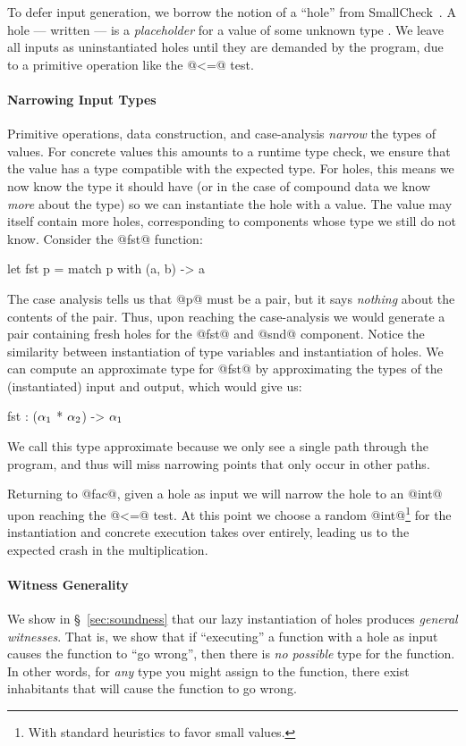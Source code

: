 To defer input generation, we borrow the notion of a ``hole'' from
SmallCheck~\cite{Runciman2008-ka}.
%
A hole --- written \vhole{\thole} --- is a \emph{placeholder} for a
value \ehole of some unknown type \thole.
%
We leave all inputs as uninstantiated holes until they are demanded by
the program, \eg due to a primitive operation like the @<=@ test.

\paragraph{Narrowing Input Types}
Primitive operations, data construction, and case-analysis \emph{narrow}
the types of values.
%
For concrete values this amounts to a runtime type check, we ensure that
the value has a type compatible with the expected type.
%
For holes, this means we now know the type it should
have (or in the case of compound data we know \emph{more} about the
type) so we can instantiate the hole with a value.
%
The value may itself contain more holes, corresponding to components
whose type we still do not know.
%
Consider the @fst@ function:
%
\begin{code}
  let fst p = match p with
    (a, b) -> a
\end{code}
%
The case analysis tells us that @p@ must be a pair, but it says
\emph{nothing} about the contents of the pair.
%
Thus, upon reaching the case-analysis we would generate a pair
containing fresh holes for the @fst@ and @snd@ component.
%
Notice the similarity between instantiation of type variables and
instantiation of holes.
%
We can compute an approximate type for @fst@ by approximating the types
of the (instantiated) input and output, which would give us:
%
\begin{mcode}
  fst : ($\alpha_1$ * $\alpha_2$) -> $\alpha_1$
\end{mcode}
%
We call this type approximate because we only see a single path through
the program, and thus will miss narrowing points that only occur in
other paths.

Returning to @fac@, given a hole as input we will narrow the hole
to an @int@ upon reaching the @<=@ test.
%
At this point we choose a
random @int@\footnote{With standard heuristics to favor small values.}
for the instantiation and
concrete execution takes over entirely, leading us to the expected crash
in the multiplication.

\paragraph{Witness Generality}
We show in \S~\ref{sec:soundness} that our lazy instantiation of holes
produces \emph{general witnesses}.
%
That is, we show that if ``executing''
a function with a hole as input causes the
function to ``go wrong'', then there is
\emph{no possible} type for the function.
%
In other words, for \emph{any} type you might
assign to the function, there exist inhabitants
that will cause the function to go wrong.

